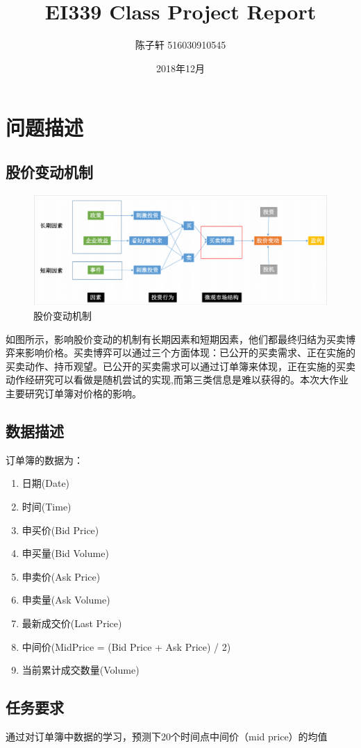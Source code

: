 \documentclass[UTF8]{ctexart}
\title{EI339 Class Project Report}
\author{陈子轩 516030910545}
\date{2018年12月}
\begin{document}
\maketitle
\tableofcontents
\section{问题描述}
\subsection{股价变动机制}
\begin{figure}[!htbp]
\centering
\includegraphics[scale = 0.6]{p1.png}
\caption{股价变动机制}
\end{figure}
如图所示，影响股价变动的机制有长期因素和短期因素，他们都最终归结为买卖博弈来影响价格。买卖博弈可以通过三个方面体现：已公开的买卖需求、正在实施的买卖动作、持币观望。已公开的买卖需求可以通过订单簿来体现，正在实施的买卖动作经研究可以看做是随机尝试的实现,而第三类信息是难以获得的。本次大作业主要研究订单簿对价格的影响。
\subsection{数据描述}
订单簿的数据为：
\begin{enumerate}[*]
    \item 日期(Date)
    \item 时间(Time)
    \item 申买价(Bid Price)
    \item 申买量(Bid Volume)
    \item 申卖价(Ask Price)
    \item 申卖量(Ask Volume)
    \item 最新成交价(Last Price)
    \item 中间价(MidPrice = (Bid Price + Ask Price) / 2)
    \item 当前累计成交数量(Volume)
\end{enumerate}
\subsection{任务要求}
通过对订单簿中数据的学习，预测下20个时间点中间价（mid price）的均值
\end{document}
